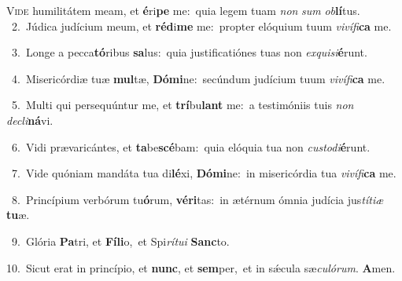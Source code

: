 \lettrine{\initial\textcolor{\initialcolor}{V}}{ide} humilitátem meam, et \textbf{é}\-ri\textbf{pe} me:~\star quia legem tuam \textit{non} \textit{sum} \textit{ob}\-\textbf{lí}tus.\\
{\numbfont\textcolor{\numbcolor}{~2.}}~Júdica judícium meum, et \textbf{réd}\-i\textbf{me} me:~\star propter elóquium tuum \textit{vi}\-\textit{ví}\textit{fi}\textbf{ca} me.\par
{\numbfont\textcolor{\numbcolor}{~3.}}~Longe a pecca\-\textbf{tó}\-ribus \textbf{sa}\-lus:~\star quia justificatiónes tuas non \textit{ex}\-\textit{qui}\textit{si}\textbf{é}runt.\par
{\numbfont\textcolor{\numbcolor}{~4.}}~Misericórdiæ tuæ \textbf{mul}\-tæ, \textbf{Dó}\-\textbf{mi}ne:~\star secúndum judícium tuum \textit{vi}\-\textit{ví}\textit{fi}\textbf{ca} me.\par
{\numbfont\textcolor{\numbcolor}{~5.}}~Multi qui persequúntur me, et \textbf{trí}\-bu\textbf{lant} me:~\star a testimóniis tuis \textit{non} \textit{de}\-\textit{cli}\textbf{ná}vi.\par
{\numbfont\textcolor{\numbcolor}{~6.}}~Vidi prævaricántes, et \textbf{ta}\-be\-\textbf{scé}\-bam:~\star quia elóquia tua non \textit{cus}\-\textit{to}\textit{di}\textbf{é}runt.\par
{\numbfont\textcolor{\numbcolor}{~7.}}~Vide quóniam mandáta tua di\-\textbf{lé}\-xi, \textbf{Dó}\-\textbf{mi}ne:~\star in misericórdia tua \textit{vi}\-\textit{ví}\textit{fi}\textbf{ca} me.\par
{\numbfont\textcolor{\numbcolor}{~8.}}~Princípium verbórum tu\-\textbf{ó}\-rum, \textbf{vé}\-\textbf{ri}tas:~\star in ætérnum ómnia judícia jus\-\textit{tí}\-\textit{ti}\textit{æ} \textbf{tu}\-æ.\par
{\numbfont\textcolor{\numbcolor}{~9.}}~Glória \textbf{Pa}\-tri, et \textbf{Fí}\-\textbf{li}o,~\star et Spi\-\textit{rí}\-\textit{tu}\textit{i} \textbf{Sanc}\-to.\par
{\numbfont\textcolor{\numbcolor}{10.}}~Sicut erat in princípio, et \textbf{nunc}\-, et \textbf{sem}\-per,~\star et in sǽcula sæ\-\textit{cu}\-\textit{ló}\textit{rum}. \textbf{A}\-men.\par
